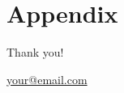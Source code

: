 \documentclass[10pt]{beamer}
\begin{document}

\newsavebox\mytempbib

\savebox\mytempbib{\parbox{\textwidth}{}}



\section*{Appendix}

\appendix
\backupbegin

\begin{frame}
    \centering
    \begin{LARGE}Thank you!\end{LARGE}

    \vspace{1em}

    \begin{Large}\href{mailto:your@email.com}{your@email.com}\end{Large}

\end{frame}

\end{document}
